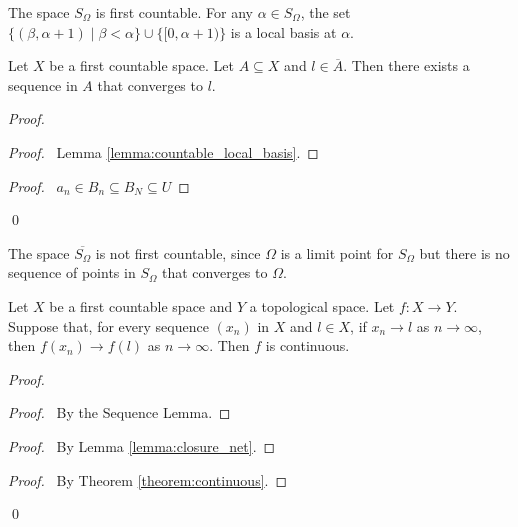 \begin{example}
    The space $S_\Omega$ is first countable. For any $\alpha \in S_\Omega$,
    the set $\{ (\beta, \alpha + 1) \mid \beta < \alpha \} \cup \{ [0, \alpha + 1) \}$
    is a local basis at $\alpha$.
\end{example}

\begin{lemma}
    Let $X$ be a first countable space. Let $A \subseteq X$ and $l \in \overline{A}$.
    Then there exists a sequence in $A$ that converges to $l$.
\end{lemma}

\begin{proof}
    \pf
    \begin{proof}
        \pf\ Lemma \ref{lemma:countable_local_basis}.
    \end{proof}
    \begin{proof}
        \pf\ $a_n \in B_n \subseteq B_N \subseteq U$
    \end{proof}
    \qed
\end{proof}

\begin{example}
    \label{example:S_Omega_bar_not_first_countable}
    The space $\overline{S_\Omega}$ is not first countable, since $\Omega$
    is a limit point for $S_\Omega$ but there is no sequence of points in
    $S_\Omega$ that converges to $\Omega$.
\end{example}

\begin{theorem}[CC]
    Let $X$ be a first countable space and $Y$ a topological space. Let $f : X \rightarrow Y$. Suppose that, for every sequence $(x_n)$ in $X$ and $l \in X$, if $x_n \rightarrow l$
    as $n \rightarrow \infty$, then $f(x_n) \rightarrow f(l)$ as $n \rightarrow \infty$. Then $f$ is continuous.
\end{theorem}

\begin{proof}
    \pf
    \begin{proof}
        \pf\ By the Sequence Lemma.
    \end{proof}
    \begin{proof}
        \pf\ By Lemma \ref{lemma:closure_net}.
    \end{proof}
    \qedstep
    \begin{proof}
        \pf\ By Theorem \ref{theorem:continuous}.
    \end{proof}
    \qed
\end{proof}

